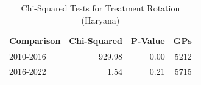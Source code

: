 \begin{table}[!h]
\centering
\caption{\label{tab:chi_sq_hr}Chi-Squared Tests for Treatment Rotation (Haryana)}
\centering
\fontsize{8}{10}\selectfont
\begin{tabular}[t]{lrrr}
\toprule
Comparison & Chi-Squared & P-Value & GPs\\
\midrule
2010-2016 & 929.98 & 0.00 & 5212\\
2016-2022 & 1.54 & 0.21 & 5715\\
\bottomrule
\end{tabular}
\end{table}
